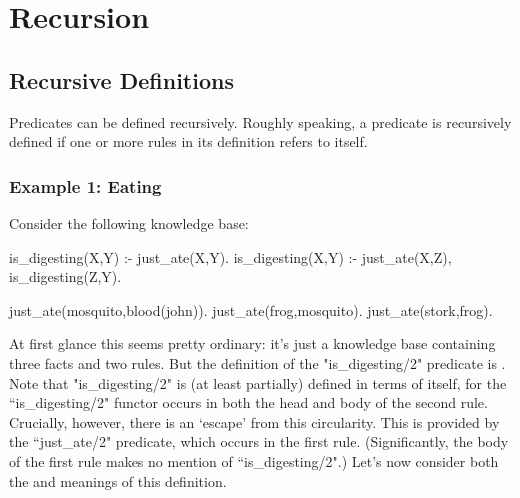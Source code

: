 
\chapter{Recursion}\label{CHAPTER3}


\section{Recursive Definitions}\label{SEC.L3.RECURSIVE.DEFINITION}



Predicates can be defined recursively.  Roughly speaking, a predicate
is recursively defined if one or more rules in its definition refers
to itself.

\subsection*{Example 1: Eating}\label{SUBSEC.L3.EX1}



Consider the following knowledge base:
\begin{LPNcodedisplay}
is_digesting(X,Y) :- just_ate(X,Y).
is_digesting(X,Y) :-
        just_ate(X,Z),
        is_digesting(Z,Y).

just_ate(mosquito,blood(john)).
just_ate(frog,mosquito).
just_ate(stork,frog).
\end{LPNcodedisplay}


At first glance this seems pretty ordinary: it's just a knowledge base
containing three facts and two rules.  But the definition of the
"is\_digesting/2" predicate is .  Note that
"is\_digesting/2" is (at least partially) defined in terms of itself,
for the ``is\_digesting/2" functor occurs in both the head and body of
the second rule.  Crucially, however, there is an `escape' from this
circularity.  This is provided by the ``just\_ate/2" predicate, which
occurs in the first rule.  (Significantly, the body of the first rule
makes no mention of ``is\_digesting/2".)  Let's now consider both the
 and  meanings of this definition.

